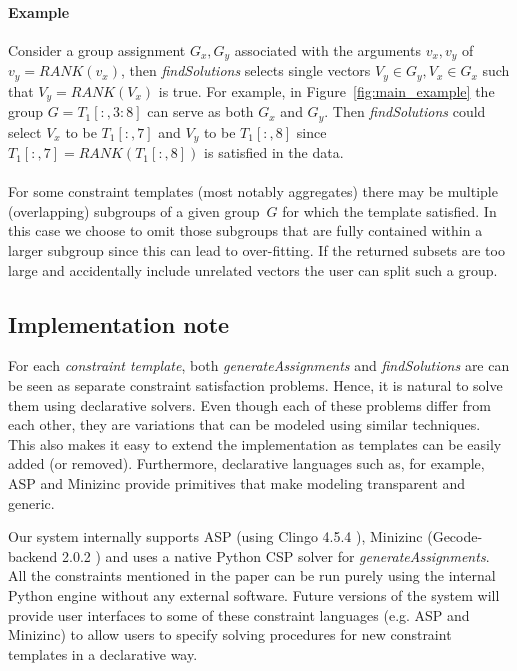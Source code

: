 \documentclass{sig-alternate-05-2015}
\newcommand{\format}[1]{\textit{#1}\xspace}
\newcommand{\generategroups}{\format{generateAssignments}}
\newcommand{\findassignment}{\format{findSolutions}}
\newcommand{\template}{\format{constraint template}}
\newcommand{\range}[3]{\ensuremath{#1[#2,#3]}}
\newcommand{\rangeto}[2]{#1{:}#2}
\newcommand{\rangeall}{:}
\newcommand{\eccalc}[2]{\ensuremath{#1 = #2}}
\newcommand{\ecrank}[2]{\eccalc{#1}{\mathit{RANK}(#2)}}
\begin{document}
\paragraph{Example}
Consider a group assignment $G_x, G_y$ associated with the arguments $v_x,v_y$ of \ecrank{v_y}{v_x}, then \findassignment selects single vectors $V_y \in G_y, V_x \in G_x$ such that \ecrank{V_y}{V_x} is true.
For example, in Figure~\ref{fig:main_example} the group $G = \range{T_1}{\rangeall}{\rangeto{3}{8}}$ can serve as both $G_x$ and $G_y$.
Then \findassignment could select $V_x$ to be $\range{T_1}{\rangeall}{7}$ and $V_y$ to be $\range{T_1}{\rangeall}{8}$ since \ecrank{\range{T_1}{\rangeall}{7}}{\range{T_1}{\rangeall}{8}} is satisfied in the data.
\\\\
For some constraint templates (most notably aggregates) there may be multiple (overlapping) subgroups of a given group~$G$ for which the template satisfied.
In this case we choose to omit those subgroups that are fully contained within a larger subgroup since this can lead to over-fitting.
If the returned subsets are too large and accidentally include unrelated vectors the user can split such a group.

\subsection{Implementation note}
For each \template, both \generategroups and \findassignment are can be seen as separate constraint satisfaction problems.
Hence, it is natural to solve them using declarative solvers.
Even though each of these problems differ from each other, they are variations that can be modeled using similar techniques.
This also makes it easy to extend the implementation as templates can be easily added (or removed).
Furthermore, declarative languages such as, for example, ASP \cite{whaisasp} and Minizinc \cite{minizinc} provide primitives that make modeling transparent and generic.

Our system internally supports ASP (using Clingo 4.5.4 \cite{clingo}), Minizinc (Gecode-backend 2.0.2 \cite{minizinc}) and uses a native Python CSP solver \cite{python_constraint} for \generategroups.
All the constraints mentioned in the paper can be run purely using the internal Python engine without any external software.
Future versions of the system will provide user interfaces to some of these constraint languages (e.g. ASP and Minizinc) to allow users to specify solving procedures for new constraint templates in a declarative way.
\end{document}
